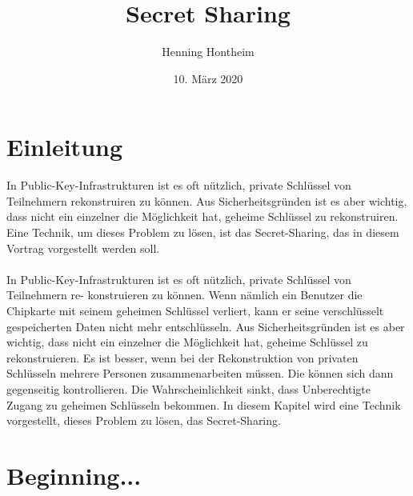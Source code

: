 \documentclass[12pt, a4paper, oneside, titlepage]{report}
\author{Henning Hontheim}
\title{Secret Sharing}
\date{10. März 2020}
\theoremstyle{definition}
\begin{document}
	\maketitle
	\tableofcontents
	
	\section{Einleitung}
	
	In Public-Key-Infrastrukturen ist es oft nützlich, private Schlüssel von Teilnehmern rekonstruiren zu können. Aus Sicherheitsgründen ist es aber wichtig, dass nicht ein einzelner die Möglichkeit hat, geheime Schlüssel zu rekonstruiren. Eine Technik, um dieses Problem zu lösen, ist das Secret-Sharing, das in diesem Vortrag vorgestellt werden soll.
	\\\\
	In Public-Key-Infrastrukturen ist es oft nützlich, private Schlüssel von Teilnehmern re- konstruieren zu können. Wenn nämlich ein Benutzer die Chipkarte mit seinem geheimen Schlüssel verliert, kann er seine verschlüsselt gespeicherten Daten nicht mehr entschlüsseln. Aus Sicherheitsgründen ist es aber wichtig, dass nicht ein einzelner die Möglichkeit hat, geheime Schlüssel zu rekonstruieren. Es ist besser, wenn bei der Rekonstruktion von privaten Schlüsseln mehrere Personen zusammenarbeiten müssen. Die können sich dann gegenseitig kontrollieren. Die Wahrscheinlichkeit sinkt, dass Unberechtigte Zugang zu geheimen Schlüsseln bekommen. In diesem Kapitel wird eine Technik vorgestellt, dieses Problem zu lösen, das Secret-Sharing. \cite{buchmann}
	
	
	\section{Beginning...}
	
	
	
\end{document}
